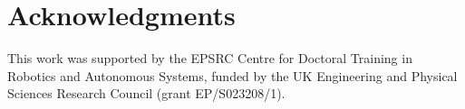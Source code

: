 \documentclass[runningheads]{llncs}
\begin{document}
\section*{Acknowledgments}

This work was supported by the EPSRC Centre for Doctoral Training in Robotics
and Autonomous Systems, funded by the UK Engineering and Physical Sciences
Research Council (grant EP/S023208/1).



\end{document}

